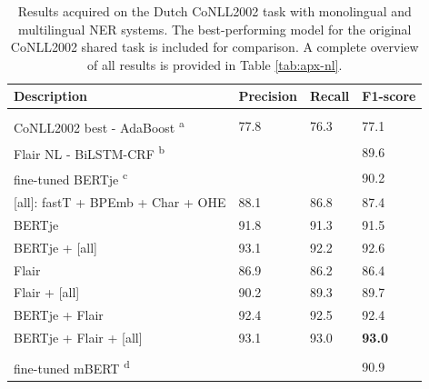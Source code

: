 \documentclass[12pt,a4paper,]{book}
\begin{document}
\begin{table}

\caption{\label{tab:conll2002-tab}Results acquired on the Dutch CoNLL2002 task with monolingual and multilingual NER systems. The best-performing model for the original CoNLL2002 shared task \citep{carreras2002} is included for comparison. A complete overview of all results is provided in Table \ref{tab:apx-nl}.}
\centering
\begin{tabular}[t]{llll}
\toprule
Description & Precision & Recall & F1-score\\
\midrule
\addlinespace[0.3em]
\multicolumn{4}{l}{\textbf{Monolingual}}\\
\textcolor[HTML]{999999}{\hspace{1em}CoNLL2002 best - AdaBoost \textsuperscript{a}} & \textcolor[HTML]{999999}{77.8} & \textcolor[HTML]{999999}{76.3} & \textcolor[HTML]{999999}{77.1}\\
\textcolor[HTML]{999999}{\hspace{1em}Flair NL - BiLSTM-CRF \textsuperscript{b}} & \textcolor[HTML]{999999}{} & \textcolor[HTML]{999999}{} & \textcolor[HTML]{999999}{89.6}\\
\textcolor[HTML]{999999}{\hspace{1em}fine-tuned BERTje \textsuperscript{c}} & \textcolor[HTML]{999999}{} & \textcolor[HTML]{999999}{} & \textcolor[HTML]{999999}{90.2}\\
\hspace{1em}[all]: fastT + BPEmb + Char + OHE & 88.1 & 86.8 & 87.4\\
\hspace{1em}BERTje & 91.8 & 91.3 & 91.5\\
\hspace{1em}BERTje + [all] & 93.1 & 92.2 & 92.6\\
\hspace{1em}Flair & 86.9 & 86.2 & 86.4\\
\hspace{1em}Flair + [all] & 90.2 & 89.3 & 89.7\\
\hspace{1em}BERTje + Flair & 92.4 & 92.5 & 92.4\\
\hspace{1em}BERTje + Flair + [all] & 93.1 & 93.0 & \textbf{93.0}\\
\addlinespace[0.3em]
\multicolumn{4}{l}{\textbf{Multilingual}}\\
\textcolor[HTML]{999999}{\hspace{1em}fine-tuned mBERT \textsuperscript{d}} & \textcolor[HTML]{999999}{} & \textcolor[HTML]{999999}{} & \textcolor[HTML]{999999}{90.9}\\

\end{tabular}
\end{table}
\end{document}
